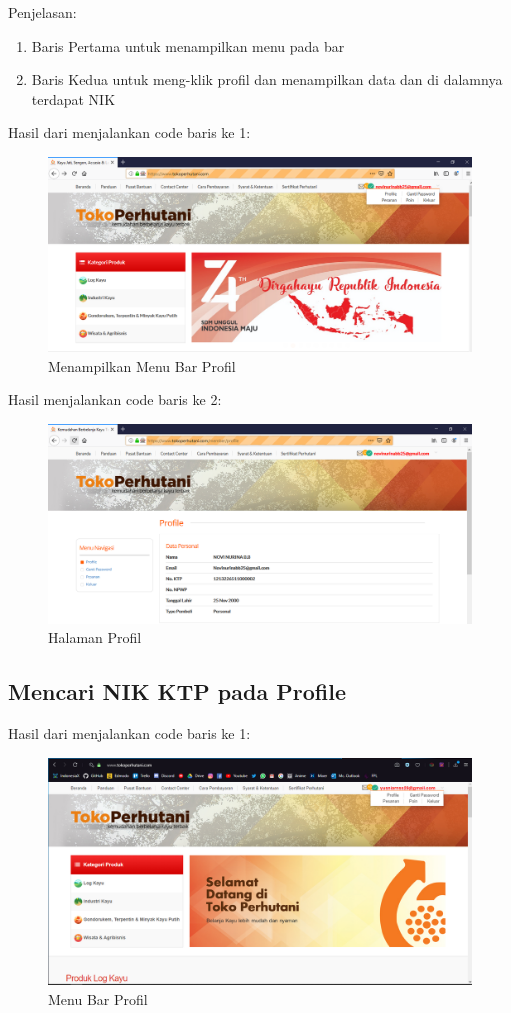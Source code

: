 Penjelasan:
\begin{enumerate}
	\item Baris Pertama untuk menampilkan menu pada bar
	\item Baris Kedua untuk meng-klik profil dan menampilkan data dan di dalamnya terdapat NIK
\end{enumerate}

Hasil dari menjalankan code baris ke 1:
\begin{figure}[h]
	\centering
	\includegraphics[scale=0.25]{figures/caripropil}
	\caption{Menampilkan Menu Bar Profil}
\end{figure}

Hasil menjalankan code baris ke 2:
\begin{figure}[h]
	\centering
	\includegraphics[scale=0.25]{figures/cari}
	\caption{Halaman Profil}
\end{figure}

\newpage
\subsection {Mencari NIK KTP pada Profile}
Hasil dari menjalankan code baris ke 1:
\begin{figure}[h]
	\centering
	\includegraphics[scale=0.25]{figures/735menuprofile}
	\caption{Menu Bar Profil}
\end{figure}

